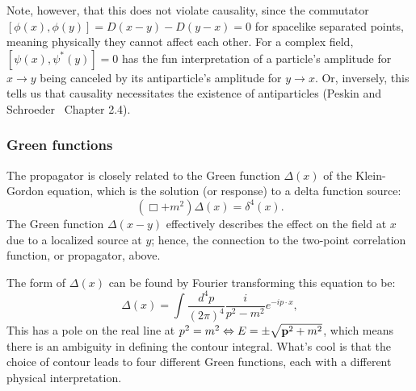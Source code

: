 Note, however, that this does not violate causality, since the commutator $[\phi(x), \phi(y)] = D(x- y) - D(y-x) = 0$ for spacelike separated points, meaning physically they cannot affect each other.
For a complex field, $[\psi(x), \psi^*(y)] = 0$ has the fun interpretation of a particle's amplitude for $x \rightarrow y$ being canceled by its antiparticle's amplitude for $y \rightarrow x$.
Or, inversely, this tells us that causality necessitates the existence of antiparticles (Peskin and Schroeder~\cite{Peskin:1995ev} Chapter 2.4).

\subsubsection{Green functions}

The propagator is closely related to the Green function $\Delta(x)$ of the Klein-Gordon equation, which is the solution (or response) to a delta function source:
\begin{equation}
    \label{eq:01_qft_quantization_green_function}
    (\Box + m^2)\Delta(x) = \delta^4(x).
\end{equation}
The Green function $\Delta(x - y)$ effectively describes the effect on the field at $x$ due to a localized source at $y$; hence, the connection to the two-point correlation function, or propagator, above.

The form of $\Delta(x)$ can be found by Fourier transforming this equation to be:
\begin{equation}
    \label{eq:01_qft_quantization_propagator_fourier}
    \Delta(x) = \int \frac{d^4p}{(2\pi)^4} \frac{i}{p^2 - m^2} e^{-ip\cdot x},
\end{equation}
This has a pole on the real line at $p^2 = m^2 \Leftrightarrow E = \pm \sqrt{\mathbf{p}^2 + m^2}$, which means there is an ambiguity in defining the contour integral.
What's cool is that the choice of contour leads to four different Green functions, each with a different physical interpretation.

